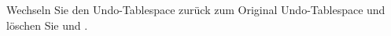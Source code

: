     \item Wechseln Sie den Undo-Tablespace zurück zum Original Undo-Tablespace und löschen Sie  und .
